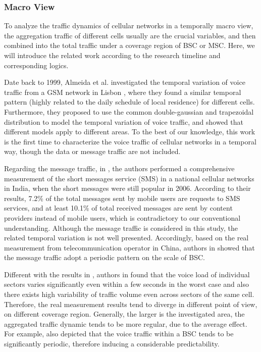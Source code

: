 {\subsubsection{Macro View}
To analyze the traffic dynamics of cellular networks in a temporally macro view, the aggregation traffic of different cells usually are the crucial variables, and then combined into the total traffic under a coverage region of BSC or MSC. Here, we will introduce the related work according to the research timeline and corresponding logics.

Date back to 1999, Almeida et al. investigated the temporal variation of voice traffic from a GSM network in Lisbon \cite{almeida1999spatial}, where they found a similar temporal pattern (highly related to the daily schedule of local residence) for different cells. Furthermore, they proposed to use the common double-gaussian and trapezoidal distribution to model the temporal variation of voice traffic, and showed that different models apply to different areas. To the best of our knowledge, this work is the first time to characterize the voice traffic of cellular networks in a temporal way, though the data or message traffic are not included.

Regarding the message traffic, in \cite{zerfos2006study}, the authors performed a comprehensive measurement of the short messages service (SMS) in a national cellular networks in India, when the short messages were still popular in 2006. According to their results, 7.2\% of the total messages sent by mobile users are requests to SMS services, and at least 10.1\% of total received messages are sent by content providers instead of mobile users, which is contradictory to our conventional understanding. Although the message traffic is considered in this study, the related temporal variation is not well presented. Accordingly, based on the real measurement from telecommunication operator in China, authors in \cite{zhou2012predictability} showed that the message traffic adopt a periodic pattern on the scale of BSC.

Different with the results in \cite{almeida1999spatial}, authors in \cite{willkomm2008primary} found that the voice load of individual sectors varies significantly even within a few seconds in the worst case and also there exists high variability of traffic volume even across sectors of the same cell. Therefore, the real measurement results tend to diverge in different point of view, on different coverage region. Generally, the larger is the investigated area, the aggregated traffic dynamic tends to be more regular, due to the average effect. For example, \cite{zhou2012predictability} also depicted that the voice traffic within a BSC tends to be significantly periodic, therefore inducing a considerable predictability.

}
